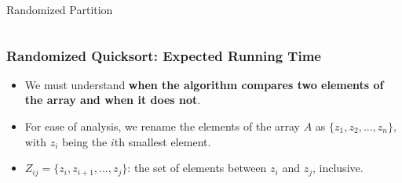 \documentclass[UTF8,11pt,handout]{beamer}
\begin{document}
\begin{frame}[t]
\begin{columns}
\begin{column}[T, onlytextwidth]{.4\textwidth}
\begin{block}{Randomized Partition}
		\end{block}
	\end{column}

	\end{columns}
\end{frame}



\begin{frame}[t]
\frametitle{Randomized Quicksort: Expected Running Time}
	\begin{itemize}
		\pause\item 	We must understand \textbf{when the algorithm compares two elements of the array and when it does not}.
		\pause\item For ease of analysis, we rename the elements of the array $A$ as $\{z_1,z_2,...,z_n\}$, with $z_i$ being the $i$th smallest element. 
		\pause\item   $Z_{ij}=\{z_i,z_{i+1},...,z_j\}$: the set of elements between $z_i$ and $z_j$, inclusive. 
	\end{itemize}


\end{frame}
\end{document}
